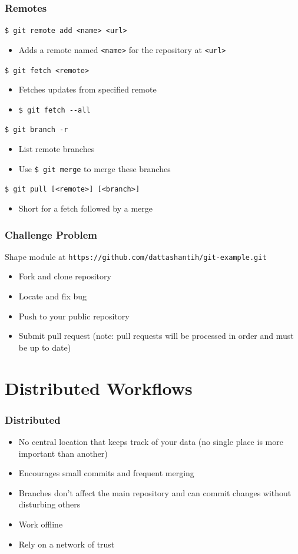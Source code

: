 \documentclass[english,compress]{beamer}
\begin{document}
\begin{frame}[fragile]
    \frametitle{Remotes}

    \verb|$ git remote add <name> <url>|
    \begin{itemize}
        \item Adds a remote named \verb|<name>| for the repository at \verb|<url>|
    \end{itemize}

    \verb|$ git fetch <remote>|
    \begin{itemize}
        \item Fetches updates from specified remote
        \item \verb|$ git fetch --all|
    \end{itemize}

    \verb|$ git branch -r |
    \begin{itemize}
        \item List remote branches
        \item Use \verb|$ git merge| to merge these branches
    \end{itemize}

    \verb|$ git pull [<remote>] [<branch>]|
    \begin{itemize}
        \item Short for a fetch followed by a merge
    \end{itemize}
\end{frame}

\begin{frame}[fragile]
    \frametitle{Challenge Problem}

    Shape module at \verb|https://github.com/dattashantih/git-example.git|
    \begin{itemize}
        \item Fork and clone repository
        \item Locate and fix bug
        \item Push to your public repository
        \item Submit pull request (note: pull requests will be processed in 
            order and must be up to date)
    \end{itemize}
\end{frame}

\section{Distributed Workflows}
\frame
{
    \frametitle{Distributed}
    \begin{itemize}
        \item No central location that keeps track of your data (no single place is more important than another)
        \item Encourages small commits and frequent merging
        \item Branches don't affect the main repository and can commit changes without disturbing others
        \item Work offline
        \item Rely on a network of trust
    \end{itemize}
}
\end{document}
